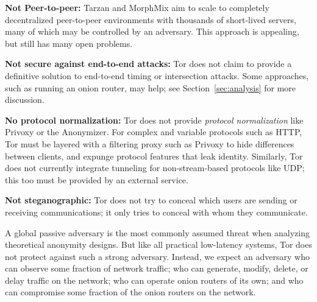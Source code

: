 \documentclass[times,10pt,twocolumn]{article}
\begin{document}
\textbf{Not Peer-to-peer:} Tarzan and MorphMix aim to scale to completely
decentralized peer-to-peer environments with thousands of short-lived
servers, many of which may be controlled by an adversary.  This approach
is appealing, but still has many open problems.

\textbf{Not secure against end-to-end attacks:} Tor does not claim
to provide a definitive solution to end-to-end timing or intersection
attacks. Some approaches, such as running an onion router, may help;
see Section~\ref{sec:analysis} for more discussion.

\textbf{No protocol normalization:} Tor does not provide \emph{protocol
normalization} like Privoxy or the Anonymizer. For complex and variable
protocols such as HTTP, Tor must be layered with a filtering proxy such
as Privoxy to hide differences between clients, and expunge protocol
features that leak identity. Similarly, Tor does not currently integrate
tunneling for non-stream-based protocols like UDP; this too must be
provided by an external service.

\textbf{Not steganographic:} Tor does not try to conceal which users are
sending or receiving communications; it only tries to conceal with whom
they communicate.

\label{subsec:threat-model}

A global passive adversary is the most commonly assumed threat when
analyzing theoretical anonymity designs. But like all practical
low-latency systems, Tor does not protect against such a strong
adversary. Instead, we expect an adversary who can observe some fraction
of network traffic; who can generate, modify, delete, or delay traffic
on the network; who can operate onion routers of its own; and who can
compromise some fraction of the onion routers on the network.

\end{document}
